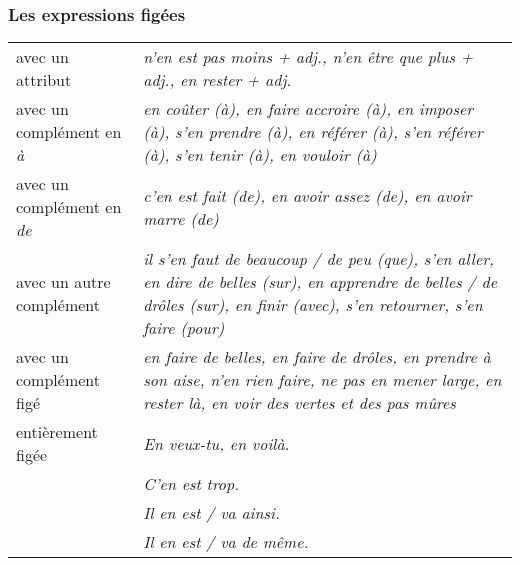 \documentclass[UTF8]{report}
\begin{document}
\subsubsection{Les expressions figées}
\begin{table}[H]
\centering
\begin{tabular}{|>{\RaggedRight\arraybackslash}m{4cm}|>{\RaggedRight\arraybackslash}m{9cm}|} %
\hline
\multicolumn{2}{|c|}{\textbf{EXPRESSION VERBALE}} \\
\hline
avec un attribut & \textit{n'en est pas moins + adj., n'en être que plus + adj., en rester + adj.} \\
\hline
avec un complément en \textit{à} & \textit{en coûter (à), en faire accroire (à), en imposer (à), s'en prendre (à), en référer (à), s'en référer (à), s'en tenir (à), en vouloir (à)} \\
\hline
avec un complément en \textit{de} & \textit{c'en est fait (de), en avoir assez (de), en avoir marre (de)} \\
\hline
avec un autre complément & \textit{il s'en faut de beaucoup / de peu (que), s'en aller, en dire de belles (sur), en apprendre de belles / de drôles (sur), en finir (avec), s'en retourner, s'en faire (pour)} \\
\hline
avec un complément figé & \textit{en faire de belles, en faire de drôles, en prendre à son aise, n'en rien faire, ne pas en mener large, en rester là, en voir des vertes et des pas mûres} \\
\hline
entièrement figée & \textit{En veux-tu, en voilà.} \\
& \textit{C'en est trop.} \\
& \textit{Il en est / va ainsi.} \\
& \textit{Il en est / va de même.} \\
\hline
\end{tabular}
\end{table}
\end{document}

